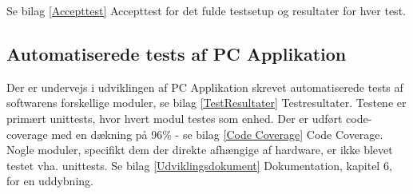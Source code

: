 Se bilag \ref{Accepttest} Accepttest for det fulde testsetup og resultater for hver test. 

\subsection{Automatiserede tests af PC Applikation}
Der er undervejs i udviklingen af PC Applikation skrevet automatiserede tests af softwarens forskellige moduler, se bilag \ref{TestResultater} Testresultater. Testene er primært unittests, hvor hvert modul testes som enhed. Der er udført code-coverage med en dækning på 96\% - se bilag \ref{Code Coverage} Code Coverage. Nogle moduler, specifikt dem der direkte afhængige af hardware, er ikke blevet testet vha. unittests. Se bilag \ref{Udviklingsdokument} Dokumentation, kapitel 6, for en uddybning. 